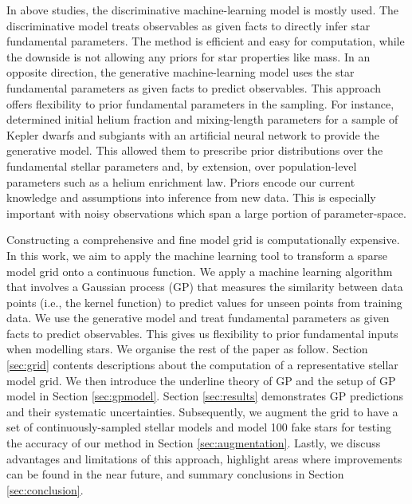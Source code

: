 In above studies, the discriminative machine-learning model is mostly used. The discriminative model treats observables as given facts to directly infer star fundamental parameters. The method is efficient and easy for computation, while the downside is not allowing any priors for star properties like mass.
%
In an opposite direction, the generative machine-learning model uses the star fundamental parameters as given facts to predict observables. This approach offers flexibility to prior fundamental parameters in the sampling. For instance,  \citet{2021MNRAS.tmp.1343L}  determined initial helium fraction and mixing-length parameters for a sample of Kepler dwarfs and subgiants with an artificial neural network to provide the generative model. This allowed them to prescribe prior distributions over the fundamental stellar parameters and, by extension, over population-level parameters such as a helium enrichment law. Priors encode our current knowledge and assumptions into inference from new data. This is especially important with noisy observations which span a large portion of parameter-space.


Constructing a comprehensive and fine model grid is computationally expensive. In this work, we aim to apply the machine learning tool to transform a sparse model grid onto a continuous function. We apply a machine learning algorithm that involves a Gaussian process (GP) that measures the similarity between data points (i.e., the kernel function) to predict values for unseen points from training data. We use the generative model and treat fundamental parameters as given facts to predict observables. This gives us flexibility to prior fundamental inputs when modelling stars. We organise the rest of the paper as follow. Section \ref{sec:grid} contents descriptions about the computation of a representative stellar model grid. We then introduce the underline theory of GP and the setup of GP model in Section \ref{sec:gpmodel}. Section \ref{sec:results} demonstrates GP predictions and their systematic uncertainties. Subsequently, we augment the grid to have a set of continuously-sampled stellar models and model 100 fake stars for testing the accuracy of our method in Section \ref{sec:augmentation}. Lastly, we discuss advantages and limitations of this approach, highlight areas where improvements can be found in the near future, and summary conclusions in Section \ref{sec:conclusion}.




